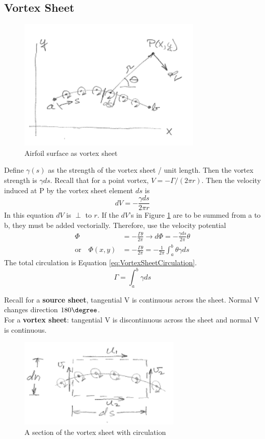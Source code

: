 \documentclass[draft=false, titlepage]{article}
\begin{document}
\subsection{Vortex Sheet}
\begin{figure}[ht]
    \centering
    \includegraphics[width=0.6\linewidth]{Figures/vortexSheet.PNG}
    \caption{Airfoil surface as vortex sheet}
    \label{fig:VortexSheet}
\end{figure}
Define $\gamma(s)$ as the strength of the vortex sheet / unit length. Then the vortex strength is $\gamma ds$. Recall that for a point vortex, $V=-\Gamma/(2\pi r)$. Then the velocity induced at P by the vortex sheet element $ds$ is
\begin{equation*}
    dV = -\frac{\gamma ds}{2\pi r}
\end{equation*}
In this equation $dV$ is $\perp$ to $r$. If the $dV$'s in Figure \ref{fig:VortexSheet} are to be summed from a to b, they must be added vectorially. Therefore, use the velocity potential
\begin{align*}
    \Phi &= -\frac{\Gamma\theta}{2\pi} \rightarrow d\Phi = -\frac{\gamma ds}{2\pi}\theta\\
    \text{or} \quad \Phi(x,y) &= -\frac{\Gamma\theta}{2\pi} = -\frac{1}{2\pi}\int_a^b\theta\gamma ds
\end{align*}
The total circulation is Equation \ref{eq:VortexSheetCirculation}.
\begin{equation}
    \Gamma = \int_a^b\gamma ds
    \label{eq:VortexSheetCirculation}
\end{equation}

Recall for a \textbf{source sheet}, tangential V is continuous across the sheet. Normal V changes direction $180\degree$.\\
For a \textbf{vortex sheet}: tangential V is discontinuous across the sheet and normal V is continuous.
\begin{figure}[ht]
    \centering
    \includegraphics[width=0.3\linewidth]{Figures/vortexSheet2.PNG}
    \caption{A section of the vortex sheet with circulation}
    \label{fig:VortexSheet2}
\end{figure}
\end{document}
